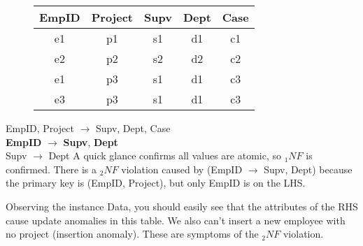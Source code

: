 \documentclass{report}
\begin{document}
    \begin{figure}[H]
    \centering
    \setlength{\tabcolsep}{30}
    \begin{tabular}{c c c c c}
    \hline 
    EmpID & Project & Supv & Dept & Case \\
\hline
    e1 & p1 & s1 & d1 & c1 \\
    e2 & p2 & s2 & d2 & c2 \\
    e1 & p3 & s1 & d1 & c3 \\
    e3 & p3 & s1 & d1 & c3 \\
    \hline
    \end{tabular}
    \end{figure}
\bigbreak \noindent
EmpID, Project $\rightarrow$ Supv, Dept, Case \\
\textbf{EmpID} $\rightarrow$ \textbf{Supv}, \textbf{Dept} \\
Supv $\rightarrow$ Dept
\bigbreak \noindent
A quick glance confirms all values are atomic, so $_1NF$ is confirmed.
\bigbreak \noindent
There is a $_2NF$ violation caused by (EmpID $\rightarrow$ Supv, Dept) because the primary key is (EmpID, Project), but only EmpID is on the LHS.

Observing the instance Data, you should easily see that the attributes of the RHS cause update anomalies in this table. We also can't insert a new employee with no project (insertion anomaly). These are symptoms of the $_2NF$ violation.

    
\end{document}
